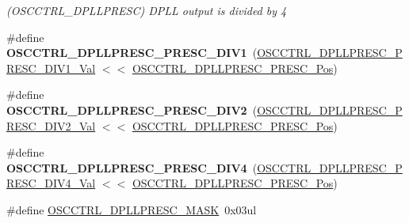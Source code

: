 \begin{DoxyCompactItemize}
\begin{DoxyCompactList}\small\item\em (O\+S\+C\+C\+T\+R\+L\+\_\+\+D\+P\+L\+L\+P\+R\+E\+S\+C) D\+P\+L\+L output is divided by 4 \end{DoxyCompactList}\item 
\hypertarget{group___s_a_m_l21___o_s_c_c_t_r_l_gaa5b1c14bf3f1dfa475b9d60331776f72}{}\#define {\bfseries O\+S\+C\+C\+T\+R\+L\+\_\+\+D\+P\+L\+L\+P\+R\+E\+S\+C\+\_\+\+P\+R\+E\+S\+C\+\_\+\+D\+I\+V1}~(\hyperlink{group___s_a_m_l21___o_s_c_c_t_r_l_ga20a6d306d06c72ebae23105a26793ef4}{O\+S\+C\+C\+T\+R\+L\+\_\+\+D\+P\+L\+L\+P\+R\+E\+S\+C\+\_\+\+P\+R\+E\+S\+C\+\_\+\+D\+I\+V1\+\_\+\+Val} $<$$<$ \hyperlink{group___s_a_m_l21___o_s_c_c_t_r_l_ga54c15cc2481ad7fcd40eb19d9011319a}{O\+S\+C\+C\+T\+R\+L\+\_\+\+D\+P\+L\+L\+P\+R\+E\+S\+C\+\_\+\+P\+R\+E\+S\+C\+\_\+\+Pos})\label{group___s_a_m_l21___o_s_c_c_t_r_l_gaa5b1c14bf3f1dfa475b9d60331776f72}

\item 
\hypertarget{group___s_a_m_l21___o_s_c_c_t_r_l_gae42e9bca13aa5bf59ddd041bb0dc62fd}{}\#define {\bfseries O\+S\+C\+C\+T\+R\+L\+\_\+\+D\+P\+L\+L\+P\+R\+E\+S\+C\+\_\+\+P\+R\+E\+S\+C\+\_\+\+D\+I\+V2}~(\hyperlink{group___s_a_m_l21___o_s_c_c_t_r_l_ga84dc31d561ba451b4d69adfb0bdbc0a5}{O\+S\+C\+C\+T\+R\+L\+\_\+\+D\+P\+L\+L\+P\+R\+E\+S\+C\+\_\+\+P\+R\+E\+S\+C\+\_\+\+D\+I\+V2\+\_\+\+Val} $<$$<$ \hyperlink{group___s_a_m_l21___o_s_c_c_t_r_l_ga54c15cc2481ad7fcd40eb19d9011319a}{O\+S\+C\+C\+T\+R\+L\+\_\+\+D\+P\+L\+L\+P\+R\+E\+S\+C\+\_\+\+P\+R\+E\+S\+C\+\_\+\+Pos})\label{group___s_a_m_l21___o_s_c_c_t_r_l_gae42e9bca13aa5bf59ddd041bb0dc62fd}

\item 
\hypertarget{group___s_a_m_l21___o_s_c_c_t_r_l_gad6020d84f7a147840a4156b3d5e5fe26}{}\#define {\bfseries O\+S\+C\+C\+T\+R\+L\+\_\+\+D\+P\+L\+L\+P\+R\+E\+S\+C\+\_\+\+P\+R\+E\+S\+C\+\_\+\+D\+I\+V4}~(\hyperlink{group___s_a_m_l21___o_s_c_c_t_r_l_ga6143f75f33c3d6ef3626eef0955f96f9}{O\+S\+C\+C\+T\+R\+L\+\_\+\+D\+P\+L\+L\+P\+R\+E\+S\+C\+\_\+\+P\+R\+E\+S\+C\+\_\+\+D\+I\+V4\+\_\+\+Val} $<$$<$ \hyperlink{group___s_a_m_l21___o_s_c_c_t_r_l_ga54c15cc2481ad7fcd40eb19d9011319a}{O\+S\+C\+C\+T\+R\+L\+\_\+\+D\+P\+L\+L\+P\+R\+E\+S\+C\+\_\+\+P\+R\+E\+S\+C\+\_\+\+Pos})\label{group___s_a_m_l21___o_s_c_c_t_r_l_gad6020d84f7a147840a4156b3d5e5fe26}

\item 
\hypertarget{group___s_a_m_l21___o_s_c_c_t_r_l_gab77eb3ce00d963ca479389d9a010f6db}{}\#define \hyperlink{group___s_a_m_l21___o_s_c_c_t_r_l_gab77eb3ce00d963ca479389d9a010f6db}{O\+S\+C\+C\+T\+R\+L\+\_\+\+D\+P\+L\+L\+P\+R\+E\+S\+C\+\_\+\+M\+A\+S\+K}~0x03ul\label{group___s_a_m_l21___o_s_c_c_t_r_l_gab77eb3ce00d963ca479389d9a010f6db}


\end{DoxyCompactItemize}
